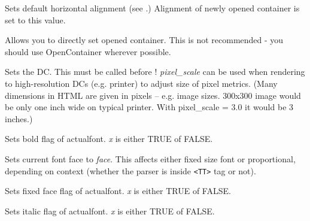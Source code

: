 Sets default horizontal alignment (see 
.)
Alignment of newly opened container is set to this value.

\label{wxhtmlwinparsersetcontainer}


Allows you to directly set opened container. This is not recommended - you should use OpenContainer
wherever possible.

\label{wxhtmlwinparsersetdc}


Sets the DC. This must be called before !
{\it pixel\_scale}  can be used when rendering to high-resolution 
DCs (e.g. printer) to adjust size of pixel metrics. (Many dimensions in 
HTML are given in pixels -- e.g. image sizes. 300x300 image would be only one
inch wide on typical printer. With pixel\_scale = 3.0 it would be 3 inches.)

\label{wxhtmlwinparsersetfontbold}


Sets bold flag of actualfont. {\it x} is either TRUE of FALSE.

\label{wxhtmlwinparsersetfontface}


Sets current font face to {\it face}. This affects either fixed size
font or proportional, depending on context (whether the parser is 
inside {\tt <TT>} tag or not).

\label{wxhtmlwinparsersetfontfixed}


Sets fixed face flag of actualfont. {\it x} is either TRUE of FALSE.

\label{wxhtmlwinparsersetfontitalic}


Sets italic flag of actualfont. {\it x} is either TRUE of FALSE.


